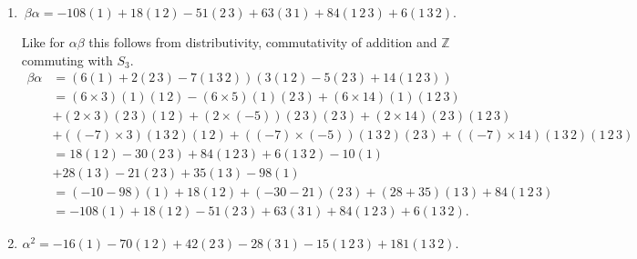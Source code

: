 \documentclass[12 pt, letterpaper]{hmcpset}
\begin{document}
\begin{solution}
\begin{enumerate}
			Here we use distributivity and commutativity of addition as usual, but we also need to use the fact that elements of $\mathbb{Z}$ commute with elements of $S_{3}$ under multiplication for the second step.
			\[
				\begin{split}
					\alpha \beta & = (3(1 \, 2) - 5 (2 \, 3) + 14(1 \, 2 \, 3))(6(1) + 2(2 \, 3) - 7(1 \, 3 \, 2)) \\
						     & = (3 \times 6) (1 \, 2) (1) - (5 \times 6) (2 \, 3) (1) + (14 \times 6)(1 \, 2 \, 3)(1) \\
						     & + (3 \times 2)(1 \, 2)(2 \, 3) + (-5 \times 2)(2 \, 3)(2 \, 3) + (14 \times 2)(1 \, 2 \, 3)(2 \, 3) \\
						     & + (3 \times(-7))(1 \, 2)(1 \, 3 \, 2) + ((-5) \times (-7))(2 \, 3)(1 \, 3 \, 2) + (14 \times (-7))(1 \, 2 \, 3)(1 \, 3 \, 2) \\
						     & = 18 (1 \, 2) - 30 (2 \, 3) + 84 (1 \, 2 \, 3) + 6 (1 \, 2 \, 3) - 10(1) \\
						     & + 28 (2 \, 1) - 21 (1 \, 3) + 35 (2 \, 1) - 98 (1) \\
						     & = (-10 - 98)(1) + (18 + 28 + 35)(1 \, 2) - 30 (2 \, 3) - 21 (1 \, 3) + (84 + 6)(1 \, 2 \, 3) \\
						     & = -108 (1) + 81 (1 \, 2) - 30 (2 \, 3) - 21 (3 \, 1) + 90 (1 \, 2 \, 3).
				\end{split}
			\]
		\item
			\[
				\boxed{
					\beta \alpha = -108 (1) + 18 (1 \, 2) - 51 (2 \, 3) + 63 (3 \, 1) + 84 (1 \, 2 \, 3) + 6 (1 \, 3 \, 2).
				}
			\]

			Like for $\alpha \beta$ this follows from distributivity, commutativity of addition and $\mathbb{Z}$ commuting with $S_{3}$.
			\[
				\begin{split}
					\beta \alpha & = (6(1) + 2(2 \, 3) - 7(1 \, 3 \, 2))(3(1 \, 2) - 5 (2 \, 3) + 14(1 \, 2 \, 3)) \\
						     & = (6 \times 3) (1) (1 \, 2) - (6 \times 5) (1) (2 \, 3) + (6 \times 14) (1) (1 \, 2 \, 3) \\
						     & + (2 \times 3) (2 \, 3) (1 \, 2) + (2 \times (-5)) (2 \, 3) (2 \, 3) + (2 \times 14) (2 \, 3) (1 \, 2 \, 3) \\
						     & + ((-7) \times 3) (1 \, 3 \, 2) (1 \, 2) + ((-7) \times (-5)) (1 \, 3 \, 2) (2 \, 3) + ((-7) \times 14) (1 \, 3 \, 2) (1 \, 2 \, 3) \\
						     & = 18 (1 \, 2) - 30 (2 \, 3) + 84 (1 \, 2 \, 3) + 6 (1 \, 3 \, 2) - 10(1) \\
						     & + 28 (1 \, 3) - 21 (2 \, 3) + 35 (1 \, 3) - 98 (1) \\
						     & = (-10 - 98)(1) + 18 (1 \, 2) + (-30 - 21) (2 \, 3) + (28 + 35) (1 \, 3) + 84 (1 \, 2 \, 3) \\
						     & = -108 (1) + 18 (1 \, 2) - 51 (2 \, 3) + 63 (3 \, 1) + 84 (1 \, 2 \, 3) + 6 (1 \, 3 \, 2).
				\end{split}
			\]
		\item
			\[
				\boxed{
					\alpha^{2} = -16 (1) - 70 (1 \, 2) + 42 (2 \, 3) - 28 (3 \, 1) -15 (1 \, 2 \, 3) + 181 (1 \, 3 \, 2).
				}
			\]


\end{enumerate}
\end{solution}
\end{document}
